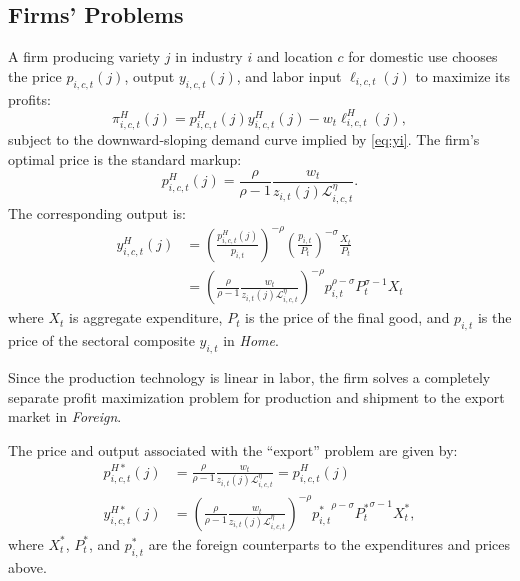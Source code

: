 \documentclass[onehalfspacing,11pt]{article}
\begin{document}
\subsection{Firms' Problems}\label{sec:problems}
A firm producing variety $j$ in industry $i$ and location $c$ for domestic use chooses the price $p_{i,c,t}(j)$, output $y_{i,c,t}(j)$, and
labor input $\ell_{i,c,t}(j)$ to maximize its profits: 
\begin{equation}
\pi_{i,c,t}^H(j) = p_{i,c,t}^H(j) y_{i,c,t}^H(j) - w_{t}\ell_{i,c,t}^H(j),  \label{eq:profit_max_static}
\end{equation}%
subject to the downward-sloping demand curve implied by \eqref{eq:yi}. The firm's optimal price is the standard
markup: 
\begin{equation}
p_{i,c,t}^H(j)=\frac{\rho }{\rho -1}\frac{w_{t}}{z_{i,t}(j) \mathcal{L}_{i,c,t}^\eta}.  \label{eq:monopolist_price}
\end{equation}%
The corresponding output is: 
\begin{align}
y_{i,c,t}^H(j) & =\left( \frac{p_{i,c,t}^H(j)}{p_{i,t}}\right) ^{-\rho} \left( \frac{p_{i,t}}{P_t} \right)^{-\sigma} \frac{X_{t}}{P_{t}} \nonumber \\
& =\left( \frac{\rho }{\rho -1}\frac{w_{t}}{z_{i,t}(j) \mathcal{L}_{i,c,t}^\eta}\right) ^{-\rho } p_{i,t}^{\rho-\sigma} P_t^{\sigma-1} X_t
\label{eq:monopolist_output}
\end{align}%
where $X_{t}$ is aggregate expenditure, $P_{t}$ is the price of the final good, and $p_{i,t}$ is the price of the sectoral composite $y_{i,t}$ in {\it Home}.

Since the production technology is linear in labor, the firm solves a completely separate profit maximization problem for production and shipment to the export market in {\it Foreign}.

The price and output associated with the ``export'' problem are given by:
\begin{align}
\label{}
p_{i,c,t}^{H*}(j) & =\frac{\rho }{\rho -1}\frac{w_{t}}{z_{i,t}(j) \mathcal{L}_{i,c,t}^\eta} = p_{i,c,t}^{H}(j)  \\
y_{i,c,t}^{H*}(j) &  =\left( \frac{\rho }{\rho -1}\frac{w_{t}}{z_{i,t}(j) \mathcal{L}_{i,c,t}^\eta} \right) ^{-\rho } {p_{i,t}^*}^{\rho-\sigma} {P_t^*}^{\sigma-1} X_t^*,
\end{align}
where $X_{t}^*$, $P_{t}^*$, and $p_{i,t}^*$ are the foreign counterparts to the expenditures and prices above.
\end{document}
